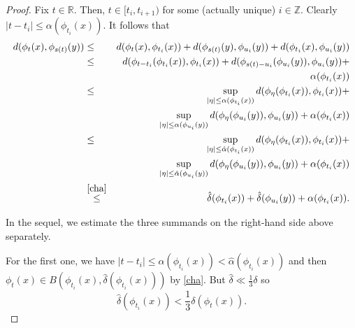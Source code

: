 \documentclass[10pt,a4paper]{amsart}
\begin{document}
\begin{proof}
Fix $t\in\mathbb{R}$. Then, $t\in [t_i,t_{i+1})$ for some (actually unique) $i\in\mathbb{Z}$. Clearly $|t-t_i|\leq \alpha(\phi_{t_i}(x))$.
It follows that
\begin{eqnarray}
\label{perra}
d(\phi_t(x),\phi_{s(t)}(y))&\leq& d(\phi_t(x),\phi_{t_i}(x))+d(\phi_{s(t)}(y),\phi_{u_i}(y))+ d(\phi_{t_i}(x),\phi_{u_i}(y))\\
\notag &\leq& d(\phi_{t-t_i}(\phi_{t_i}(x)),\phi_{t_i}(x))+d(\phi_{s(t)-u_i}(\phi_{u_i}(y)),\phi_{u_i}(y))+\\
\notag & & \alpha(\phi_{t_i}(x))\\
\notag &\leq& \sup_{|\eta|\leq \alpha(\phi_{t_i}(x))}d(\phi_\eta(\phi_{t_i}(x)),\phi_{t_i}(x))+\\
\notag & & \sup_{|\eta|\leq \alpha(\phi_{u_i}(y))}d(\phi_\eta(\phi_{u_i}(y)),\phi_{u_i}(y))+\alpha(\phi_{t_i}(x))\\
\notag &\leq& \sup_{|\eta|\leq \hat{\alpha}(\phi_{t_i}(x))}d(\phi_\eta(\phi_{t_i}(x)),\phi_{t_i}(x))+\\
\notag & & \sup_{|\eta|\leq \hat{\alpha}(\phi_{u_i}(y))}d(\phi_\eta(\phi_{u_i}(y)),\phi_{u_i}(y))+\alpha(\phi_{t_i}(x))\\
\notag &\overset{\eqref{cha}}{\leq}& \hat{\delta}(\phi_{t_i}(x))+ \hat{\delta}(\phi_{u_i}(y))+\alpha(\phi_{t_i}(x)).
\end{eqnarray}

In the sequel, we estimate the three summands on the right-hand side above separately.

For the first one, we have $|t-t_i|\leq \alpha(\phi_{t_i}(x))<\hat{\alpha}(\phi_{t_i}(x))$ and then $\phi_t(x)\in B(\phi_{t_i}(x),\hat{\delta}(\phi_{t_i}(x)))$ by \eqref{cha}.
But $\hat{\delta}\ll \frac{1}3\delta$ so
\begin{equation}
\label{perro}
\hat{\delta}(\phi_{t_i}(x))<\frac{1}3\delta(\phi_t(x)).
\end{equation}


\end{proof}
\end{document}
